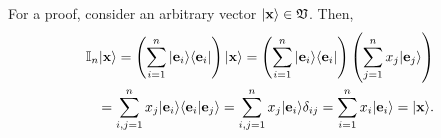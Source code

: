{\color{OliveGreen}
\bproof

For a proof, consider an arbitrary vector $\vert {\bf x} \rangle  \in {\frak V}$.
Then,
\begin{equation}
\begin{split}
 {\Bbb I}_n \vert {\bf x} \rangle
 =
\left(\sum_{i=1}^n \vert {\bf e}_i \rangle \langle {\bf e}_i \vert \right)
\vert {\bf x} \rangle
=
\left(\sum_{i=1}^n \vert {\bf e}_i \rangle \langle {\bf e}_i \vert \right)
\left(\sum_{j=1}^n x_j \vert {\bf e}_j  \rangle \right)\\
=
\sum_{i,j=1}^n x_j  \vert  {\bf e}_i \rangle \langle {\bf e}_i \vert {\bf e}_j  \rangle
=
\sum_{i,j=1}^n x_j  \vert {\bf e}_i \rangle \delta_{ij}
=
\sum_{i=1}^n x_i       \vert {\bf e}_i \rangle
=  \vert {\bf x} \rangle
.
\end{split}
\end{equation}
\eproof
}


